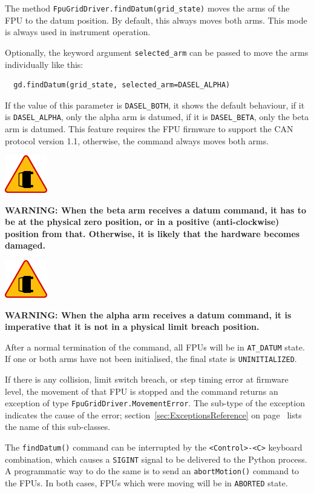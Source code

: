 \documentclass[11pt,a4paper]{report}
\newenvironment{warning}{\begin{framed}\includegraphics[width=5em]{accident-area-ahead.png}
}{\end{framed}}
\begin{document}
The method \texttt{FpuGridDriver.findDatum(grid\_state)} moves the
arms of the FPU to the datum position.  By default, this always moves
both arms. This mode is always used in instrument operation.

Optionally, the keyword argument \texttt{selected\_arm} can be passed
to move the arms individually like this:

\begin{verbatim}
  gd.findDatum(grid_state, selected_arm=DASEL_ALPHA)
\end{verbatim}

If the value of this parameter is \texttt{DASEL\_BOTH}, it shows the
default behaviour, if it is \texttt{DASEL\_ALPHA}, only the alpha arm
is datumed, if it is \texttt{DASEL\_BETA}, only the beta arm is
datumed. This feature requires the FPU firmware to support the CAN
protocol version 1.1, otherwise, the command always moves both arms.

\begin{warning}
\textbf{WARNING: When the beta arm receives a datum command, it has to
  be at the physical zero position, or in a positive (anti-clockwise)
  position from that. Otherwise, it is likely that the hardware
  becomes damaged.}
\end{warning}

\begin{warning}
\textbf{WARNING: When the alpha arm receives a datum command, it is
  imperative that it is not in a physical limit breach position.}
\end{warning}

After a normal termination of the command, all FPUs will be in
\texttt{AT\_DATUM} state. If one or both arms have not been
initialised, the final state is \texttt{UNINITIALIZED}.

If there is any collision, limit switch breach, or step timing error
at firmware level, the movement of that FPU is stopped and the command
returns an exception of type \texttt{FpuGridDriver.MovementError}. The
sub-type of the exception indicates the cause of the error;
section~\ref{sec:ExceptionsReference} on
page~\pageref{sec:ExceptionsReference} lists the name of this
sub-classes.

The \texttt{findDatum()} command can be interrupted by the
\texttt{<Control>-<C>} keyboard combination, which causes a
\texttt{SIGINT} signal to be delivered to the Python process. A
programmatic way to do the same is to send an \texttt{abortMotion()}
command to the FPUs.  In both cases, FPUs which were moving will be in
\texttt{ABORTED} state.
\end{document}
